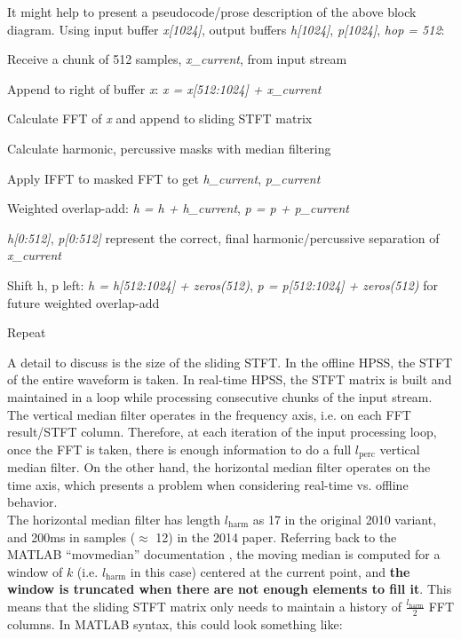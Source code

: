 \documentclass[letter,12pt]{article}
\newenvironment{tight_enumerate}{
\begin{enumerate}
  \setlength{\itemsep}{0pt}
  \setlength{\parskip}{0pt}
}{\end{enumerate}}
\begin{document}
It might help to present a pseudocode/prose description of the above block diagram. Using input buffer \textit{x[1024]}, output buffers \textit{h[1024]}, \textit{p[1024]}, \textit{hop = 512}:
\begin{tight_enumerate}
	\item Receive a chunk of 512 samples, \textit{x\_current}, from input stream
	\item Append to right of buffer \textit{x}: \textit{x = x[512:1024] + x\_current}
	\item Calculate FFT of \textit{x} and append to sliding STFT matrix
	\item Calculate harmonic, percussive masks with median filtering
	\item Apply IFFT to masked FFT to get \textit{h\_current}, \textit{p\_current}
	\item Weighted overlap-add: \textit{h = h + h\_current}, \textit{p = p + p\_current}
	\item \textit{h[0:512]}, \textit{p[0:512]} represent the correct, final harmonic/percussive separation of \textit{x\_current}
	\item Shift h, p left: \textit{h = h[512:1024] + zeros(512)}, \textit{p = p[512:1024] + zeros(512)} for future weighted overlap-add
	\item  Repeat
\end{tight_enumerate}

A detail to discuss is the size of the sliding STFT. In the offline HPSS, the STFT of the entire waveform is taken. In real-time HPSS, the STFT matrix is built and maintained in a loop while processing consecutive chunks of the input stream. The vertical median filter operates in the frequency axis, i.e. on each FFT result/STFT column. Therefore, at each iteration of the input processing loop, once the FFT is taken, there is enough information to do a full $l_{\text{perc}}$ vertical median filter. On the other hand, the horizontal median filter operates on the time axis, which presents a problem when considering real-time vs. offline behavior.\\

The horizontal median filter has length $l_{\text{harm}}$ as 17 in the original 2010 variant, and 200ms in samples ($\approx$ 12) in the 2014 paper. Referring back to the MATLAB ``movmedian'' documentation \cite{movmedian}, the moving median is computed for a window of $k$ (i.e. $l_{\text{harm}}$ in this case) centered at the current point, and \textbf{the window is truncated when there are not enough elements to fill it}. This means that the sliding STFT matrix only needs to maintain a history of $\frac{l_{\text{harm}}}{2}$ FFT columns. In MATLAB syntax, this could look something like:
\end{document}

